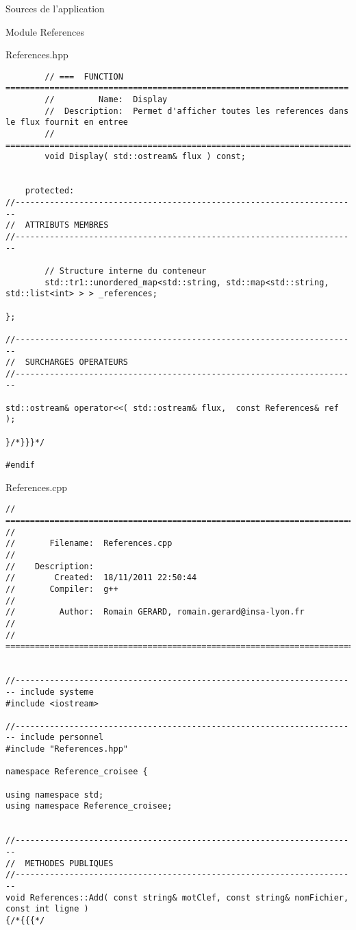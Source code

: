 \documentclass{article}
\begin{document}
\begin{section}{Sources de l'application}
\begin{subsection}{Module References}
\begin{paragraph}{References.hpp}
\begin{verbatim}
        // ===  FUNCTION  ======================================================================
        //         Name:  Display
        //  Description:  Permet d'afficher toutes les references dans le flux fournit en entree
        // =====================================================================================
        void Display( std::ostream& flux ) const;


    protected:
//----------------------------------------------------------------------
//  ATTRIBUTS MEMBRES
//----------------------------------------------------------------------

        // Structure interne du conteneur
        std::tr1::unordered_map<std::string, std::map<std::string, std::list<int> > > _references;

};

//----------------------------------------------------------------------
//  SURCHARGES OPERATEURS
//----------------------------------------------------------------------

std::ostream& operator<<( std::ostream& flux,  const References& ref );

}/*}}}*/

#endif

  \end{verbatim}
  \end{paragraph}



\newpage
  \begin{paragraph}{References.cpp}
   \begin{verbatim}
// =====================================================================================
//
//       Filename:  References.cpp
//
//    Description:
//        Created:  18/11/2011 22:50:44
//       Compiler:  g++
//
//         Author:  Romain GERARD, romain.gerard@insa-lyon.fr
//
// =====================================================================================


//---------------------------------------------------------------------- include systeme
#include <iostream>

//---------------------------------------------------------------------- include personnel
#include "References.hpp"

namespace Reference_croisee {

using namespace std;
using namespace Reference_croisee;


//----------------------------------------------------------------------
//  METHODES PUBLIQUES
//----------------------------------------------------------------------
void References::Add( const string& motClef, const string& nomFichier, const int ligne )
{/*{{{*/



\end{verbatim}
\end{paragraph}
\end{subsection}
\end{section}
\end{document}
